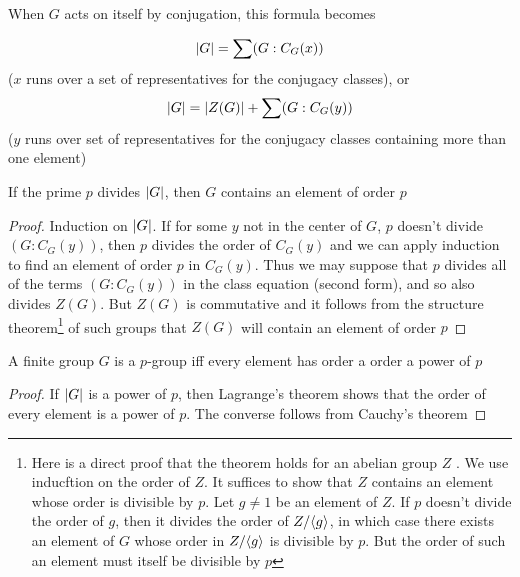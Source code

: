 \documentclass[11pt]{article}
\begin{document}
When \(G\) acts on itself by conjugation, this formula becomes
\begin{proposition}
\begin{equation*}
\abs{G}=\sum(G:C_G(x))
\end{equation*}
(\(x\) runs over a set of representatives for the conjugacy classes), or
\begin{equation*}
\abs{G}=\abs{Z(G)}+\sum(G:C_G(y))
\end{equation*}
(\(y\) runs over set of representatives for the conjugacy classes containing more than one element)
\end{proposition}

\begin{theorem}[Cauchy]
If the prime \(p\) divides \(\abs{G}\), then \(G\) contains an element of order \(p\)
\end{theorem}

\begin{proof}
Induction on \(\abs{G}\). If for some \(y\) not in the center of \(G\), \(p\) doesn't
divide \((G:C_G(y))\), then \(p\) divides the order of \(C_G(y)\) and we can apply induction to
find an element of order \(p\) in \(C_G(y)\). Thus we may suppose that \(p\) divides all of the
terms \((G:C_G(y))\) in the class equation (second form), and so also divides \(Z(G)\).
But \(Z(G)\) is commutative and it follows from the structure theorem\footnote{Here is a direct proof that the theorem holds for an abelian group \(Z\) . We use inducftion
on the order of \(Z\). It suffices to show that \(Z\) contains an element whose order is divisible
by \(p\). Let \(g\neq 1\) be an element of \(Z\). If \(p\) doesn't divide the order of \(g\), then it
divides the order of \(Z/\langle g\rangle\), in which case there exists an element of \(G\) whose order
in \(Z/\langle g\rangle\) is divisible by \(p\). But the order of such  an element must itself be divisible by \(p\)}  of such groups
that \(Z(G)\) will contain an element of order \(p\)
\end{proof}

\begin{corollary}[]
A finite group \(G\) is a \(p\)-group iff every element has order a order a power of \(p\)
\end{corollary}

\begin{proof}
If \(\abs{G}\) is a power of \(p\), then Lagrange's theorem shows that the order of every
element is a power of \(p\). The converse follows from Cauchy's theorem
\end{proof}
\end{document}

